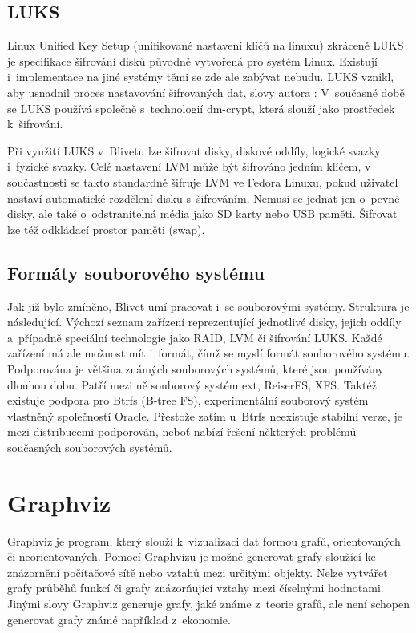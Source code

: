 \documentclass[color,table,oneside,nolot,nolof]{fithesis}
\begin{document}
\subsection{LUKS}
	Linux Unified Key Setup (unifikované nastavení klíčů na linuxu) zkráceně LUKS je specifikace šifrování disků původně vytvořená pro systém Linux. Existují i~implementace na jiné 
	systémy
	těmi se zde ale zabývat nebudu. LUKS vznikl, aby usnadnil proces nastavování šifrovaných dat, slovy autora : \cite{on-disk-format} V~současné době se LUKS používá společně s~technologií dm-crypt, která slouží jako prostředek k~šifrování.

	Při využití LUKS v~Blivetu lze šifrovat disky, diskové oddíly, logické svazky i~fyzické svazky. Celé nastavení LVM může být šifrováno jedním klíčem, v součastnosti se takto 
	standardně šifruje LVM ve Fedora Linuxu, pokud uživatel nastaví automatické rozdělení disku s~šifrováním. Nemusí se jednat jen o~pevné disky, ale také o~odstranitelná média jako
	SD karty nebo USB paměti. Šifrovat lze též odkládací prostor paměti (swap).

\subsection{Formáty souborového systému}
  Jak již bylo zmíněno, Blivet umí pracovat i~se souborovými systémy. Struktura je následující. Výchozí seznam zařízení reprezentující jednotlivé disky, jejich oddíly a~případně
	speciální technologie jako RAID, LVM či šifrování LUKS. Každé zařízení má ale možnost mít i~formát, čímž se myslí formát souborového systému. Podporována je většina známých 
	souborových
	systémů, které jsou používány dlouhou dobu. Patří mezi ně souborový systém ext, ReiserFS, XFS. Taktéž existuje podpora pro Btrfs (B-tree FS), experimentální souborový systém 
	vlastněný společností Oracle. Přestože zatím u~Btrfs neexistuje stabilní verze, je mezi distribucemi podporován, neboť nabízí řešení některých problémů současných souborových systémů.

\section{Graphviz}
	Graphviz je program, který slouží k~vizualizaci dat formou grafů, orientovaných či neorientovaných. Pomocí Graphvizu je možné generovat grafy sloužící ke znázornění počítačové sítě nebo
	vztahů mezi určitými objekty. Nelze vytvářet grafy průběhů funkcí či grafy znázorňující vztahy mezi číselnými hodnotami. Jinými slovy Graphviz generuje grafy, jaké známe z~teorie grafů,
	ale není schopen generovat grafy známé například z~ekonomie.
\end{document}
